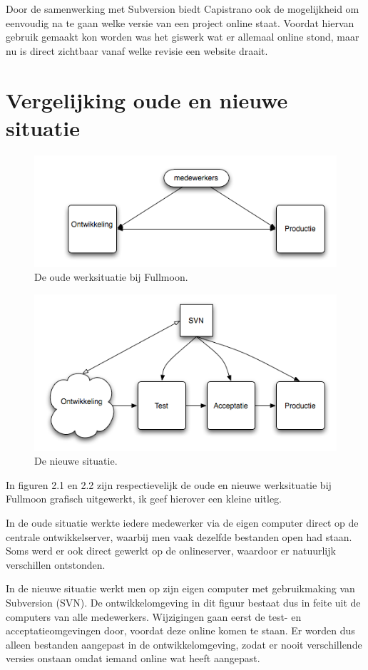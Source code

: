Door de samenwerking met Subversion biedt Capistrano ook de mogelijkheid om eenvoudig na te gaan welke versie van een project online staat. Voordat hiervan gebruik gemaakt kon worden was het giswerk wat er allemaal online stond, maar nu is direct zichtbaar vanaf welke revisie een website draait. 

\section{Vergelijking oude en nieuwe situatie}

\begin{figure}
  \centering
  \includegraphics[scale=0.70]{situatie_oud.png}
  \caption[Oude situatie.]{De oude werksituatie bij Fullmoon.}
\end{figure}

\begin{figure}
  \centering
  \includegraphics[scale=0.70]{situatie_nieuw.png}
  \caption[Nieuwe situatie.]{De nieuwe situatie.}
\end{figure}

In figuren 2.1 en 2.2 zijn respectievelijk de oude en nieuwe werksituatie bij Fullmoon grafisch uitgewerkt, ik geef hierover een kleine uitleg.

In de oude situatie werkte iedere medewerker via de eigen computer direct op de centrale ontwikkelserver, waarbij men vaak dezelfde bestanden open had staan. Soms werd er ook direct gewerkt op de onlineserver, waardoor er natuurlijk verschillen ontstonden.

In de nieuwe situatie werkt men op zijn eigen computer met gebruikmaking van Subversion (SVN). De ontwikkelomgeving in dit figuur bestaat dus in feite uit de computers van alle medewerkers. Wijzigingen gaan eerst de test- en acceptatieomgevingen door, voordat deze online komen te staan. Er worden dus alleen bestanden aangepast in de ontwikkelomgeving, zodat er nooit verschillende versies onstaan omdat iemand online wat heeft aangepast.